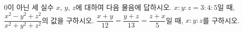 $0$이 아닌 세 실수 $x$, $y$, $z$에 대하여 다음 물음에 답하시오.
 $x:y:z=3:4:5$일 때, $\dfrac{x^2-y^2+z^2}{x^2+y^2+z^2}$의 값을 구하시오.
 $\dfrac{x+y}{12}=\dfrac{y+z}{13}=\dfrac{z+x}{5}$일 때, $x:y:z$를 구하시오.
